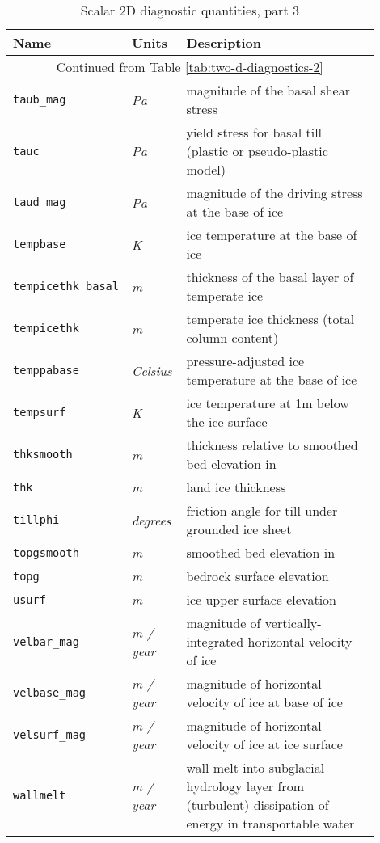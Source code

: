\begin{table}[ht]
  \centering
  \begin{tabular}{p{0.15\linewidth}p{0.15\linewidth}p{0.6\linewidth}}
    \toprule
    \textbf{Name} & \textbf{Units} & \textbf{Description} \\
    \midrule
    \multicolumn{3}{c}{Continued from Table \ref{tab:two-d-diagnostics-2}}\\
    \texttt{taub_mag} & \textsl{Pa} & magnitude of the basal shear stress \\
    \texttt{tauc} & \textsl{Pa} & yield stress for basal till (plastic or pseudo-plastic model) \\
    \texttt{taud_mag} & \textsl{Pa} &  magnitude of the driving stress at the base of ice \\
    \texttt{tempbase} & \textsl{K} &  ice temperature at the base of ice \\
    \texttt{tempicethk_basal} & \textsl{m} &  thickness of the basal layer of temperate ice \\
    \texttt{tempicethk} & \textsl{m} &  temperate ice thickness (total column content) \\
    \texttt{temppabase} & \textsl{Celsius} &  pressure-adjusted ice temperature at the base of ice \\
    \texttt{tempsurf} & \textsl{K} &  ice temperature at 1m below the ice surface \\
    \texttt{thksmooth} & \textsl{m} &  thickness relative to smoothed bed elevation in \cite{Schoofbasaltopg2003} \\
    \texttt{thk} & \textsl{m} & land ice thickness \\
    \texttt{tillphi} & \textsl{degrees} & friction angle for till under grounded ice sheet \\
    \texttt{topgsmooth} & \textsl{m} &  smoothed bed elevation in \cite{Schoofbasaltopg2003}\\
    \texttt{topg} & \textsl{m} & bedrock surface elevation \\
    \texttt{usurf} & \textsl{m} & ice upper surface elevation \\
    \texttt{velbar_mag} & \textsl{m / year} &  magnitude of vertically-integrated horizontal velocity of ice \\
    \texttt{velbase_mag} & \textsl{m / year} &  magnitude of horizontal velocity of ice at base of ice \\
    \texttt{velsurf_mag} & \textsl{m / year} &  magnitude of horizontal velocity of ice at ice surface \\
    \texttt{wallmelt} & \textsl{m / year} & wall melt into subglacial hydrology layer from (turbulent) dissipation of energy in transportable water\\
    \bottomrule
  \end{tabular}
  \caption{Scalar 2D diagnostic quantities, part 3}
  \label{tab:two-d-diagnostics-3}
\end{table}

